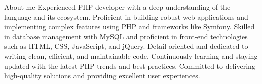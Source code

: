 \documentclass[]{kyvernitis-resume}
\begin{document}
\resumeheader
{}
{}
{}
{}
{}

\begin{section}{About me}
Experienced PHP developer with a deep understanding of the language and its ecosystem. Proficient in building robust web applications and implementing complex features using PHP and frameworks like Symfony. Skilled in database management with MySQL and proficient in front-end technologies such as HTML, CSS, JavaScript, and jQuery. Detail-oriented and dedicated to writing clean, efficient, and maintainable code. Continuously learning and staying updated with the latest PHP trends and best practices. Committed to delivering high-quality solutions and providing excellent user experiences.
\end{section}
\end{document}
